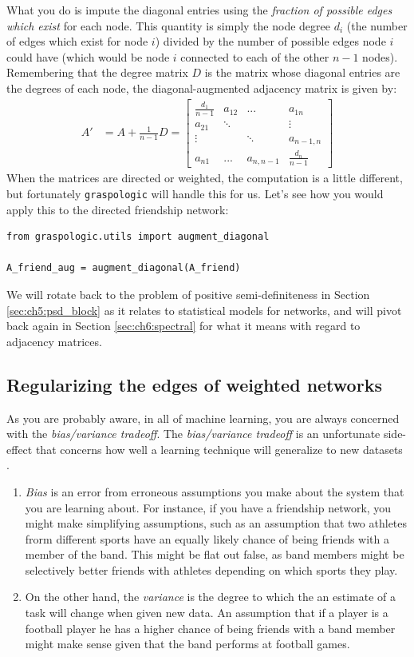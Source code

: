 What you do is impute the diagonal entries using the \emph{fraction of possible edges which exist} for each node. This quantity is simply the node degree $d_i$ (the number of edges which exist for node $i$) divided by the number of possible edges node $i$ could have (which would be node $i$ connected to each of the other $n-1$ nodes). Remembering that the degree matrix $D$ is the matrix whose diagonal entries are the degrees of each node, the diagonal-augmented adjacency matrix is given by:
\begin{align*}
    A' &= A + \frac{1}{n-1}D = \begin{bmatrix}
        \frac{d_1}{n-1} & a_{12} & ... & a_{1n} \\
        a_{21}& \ddots & & \vdots \\
        \vdots & & \ddots & a_{n-1, n} \\
        a_{n1} &...& a_{n, n-1} & \frac{d_n}{n-1}
    \end{bmatrix}
\end{align*}
When the matrices are directed or weighted, the computation is a little different, but fortunately \texttt{graspologic} will handle this for us. Let's see how you would apply this to the directed friendship network:
\begin{lstlisting}[style=python]
from graspologic.utils import augment_diagonal

A_friend_aug = augment_diagonal(A_friend)
\end{lstlisting}
We will rotate back to the problem of positive semi-definiteness in Section \ref{sec:ch5:psd_block} as it relates to statistical models for networks, and will pivot back again in Section \ref{sec:ch6:spectral} for what it means with regard to adjacency matrices.

\subsection{Regularizing the edges of weighted networks}

As you are probably aware, in all of machine learning, you are always concerned with the \emph{bias/variance tradeoff}. The \textit{bias/variance tradeoff} is an unfortunate side-effect that concerns how well a learning technique will generalize to new datasets \cite{Hastie2009}.
\begin{enumerate}
    \item \textit{Bias} is an error from erroneous assumptions you make about the system that you are learning about. For instance, if you have a friendship network, you might make simplifying assumptions, such as an assumption that two athletes frorm different sports have an equally likely chance of being friends with a member of the band. This might be flat out false, as band members might be selectively better friends with athletes depending on which sports they play.
    \item On the other hand, the \textit{variance} is the degree to which the an estimate of a task will change when given new data. An assumption that if a player is a football player he has a higher chance of being friends with a band member might make sense given that the band performs at football games. 
\end{enumerate}

